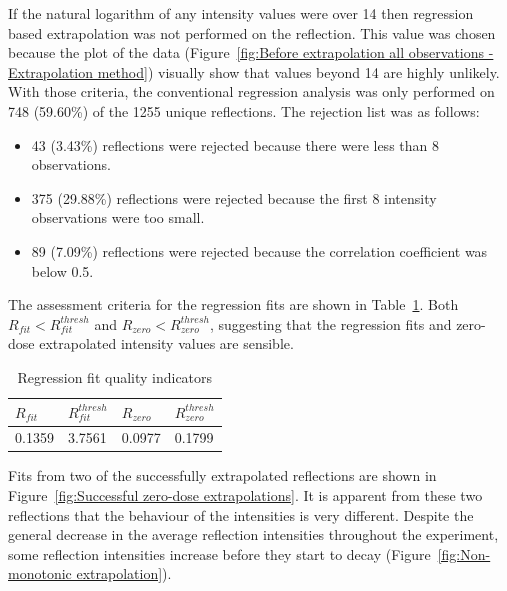 If the natural logarithm of any intensity values were over 14 then regression based extrapolation was not performed on the reflection.
This value was chosen because the plot of the data (Figure~\ref{fig:Before extrapolation all observations - Extrapolation method}) visually show that values beyond 14 are highly unlikely.
With those criteria, the conventional regression analysis was only performed on 748 (59.60\%) of the 1255 unique reflections.
The rejection list was as follows:
\begin{itemize}
    \item 43 (3.43\%) reflections were rejected because there were less than 8 observations.
    \item 375 (29.88\%) reflections were rejected because the first 8 intensity observations were too small.
    \item 89 (7.09\%) reflections were rejected because the correlation coefficient was below 0.5.
\end{itemize}
The assessment criteria for the regression fits are shown in Table~\ref{tab:R_fit and R_zero values}.
Both $R_{fit} < R^{thresh}_{fit}$ and $R_{zero} < R^{thresh}_{zero}$, suggesting that the regression fits and zero-dose extrapolated intensity values are sensible.
\begin{table}[ht!]
	\caption{Regression fit quality indicators}
	\centering
	\begin{tabular}{p{1.5cm} | p{1.5cm} | p{1.5cm} | p{1.5cm}}
		$R_{fit}$     & $R^{thresh}_{fit}$    & $R_{zero}$   & $R^{thresh}_{zero}$  \\
		\hline
		0.1359        & 3.7561                & 0.0977       & 0.1799        \\
	\end{tabular}
	\label{tab:R_fit and R_zero values}
\end{table}
Fits from two of the successfully extrapolated reflections are shown in Figure~\ref{fig:Successful zero-dose extrapolations}.
It is apparent from these two reflections that the behaviour of the intensities is very different.
Despite the general decrease in the average reflection intensities throughout the experiment, some reflection intensities increase before they start to decay (Figure~\ref{fig:Non-monotonic extrapolation}).
